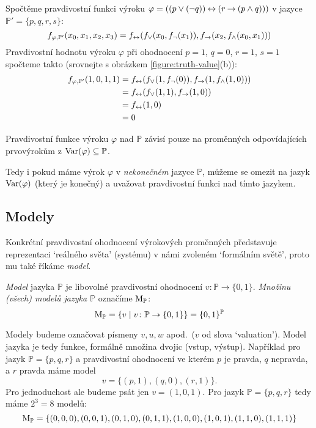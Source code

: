 \begin{example}
    Spočtěme pravdivostní funkci výroku $\varphi = ((p\lor (\neg q)) \mathbin{\leftrightarrow} (r\mathbin{\rightarrow} (p \land q)))$ v jazyce~$\mathbb P'=\{p,q,r,s\}$:
    $$        
    f_{\varphi,\mathbb P'}(x_0,x_1,x_2,x_3)=f_{\mathbin{\leftrightarrow}}(f_{\lor}(x_0,f_\neg(x_1)),f_{\mathbin{\rightarrow}}(x_2,f_{\land}(x_0,x_1)))    
    $$
    Pravdivostní hodnotu výroku $\varphi$ při ohodnocení $p=1$, $q=0$, $r=1$, $s=1$ spočteme takto (srovnejte s obrázkem \ref{figure:truth-value}(b)):
    \begin{align*}
    f_{\varphi,\mathbb P'}(1,0,1,1)
        &=f_{\mathbin{\leftrightarrow}}(f_{\lor}(1,f_\neg(0)),f_{\mathbin{\rightarrow}}(1,f_{\land}(1,0))) \\
        &=f_{\mathbin{\leftrightarrow}}(f_{\lor}(1,1),f_{\mathbin{\rightarrow}}(1,0))\\
        &=f_{\mathbin{\leftrightarrow}}(1,0)\\
        &=0
    \end{align*}
\end{example}

\begin{observation}
Pravdivostní funkce výroku $\varphi$ nad $\mathbb P$ závisí pouze na proměnných odpovídajících prvovýrokům z $\operatorname{Var}(\varphi)\subseteq\mathbb P$.
\end{observation}

Tedy i pokud máme výrok $\varphi$ v \emph{nekonečném} jazyce $\mathbb P$, můžeme se omezit na jazyk $\operatorname{Var}(\varphi)$ (který je konečný) a uvažovat pravdivostní funkci nad tímto jazykem. 


\subsection{Modely}

Konkrétní pravdivostní ohodnocení výrokových proměnných představuje reprezentaci `reálného světa' (systému) v námi zvoleném `formálním světě', proto mu také říkáme \emph{model}.

\begin{definition}\label{definition:model}
    \emph{Model} jazyka $\mathbb P$ je libovolné pravdivostní ohodnocení $v\colon \mathbb P\to \{0,1\}$. \emph{Množinu (všech) modelů jazyka $\mathbb P$} označíme  $\operatorname{M}_\mathbb P$:
    $$
    \operatorname{M}_\mathbb P=\left\{v\mid v\colon \mathbb P\to \{0,1\}\right\}=\{0,1\}^\mathbb P
    $$
\end{definition}
Modely budeme označovat písmeny $v,u,w$ apod.\ ($v$ od slova `valuation'). Model jazyka je tedy funkce, formálně množina dvojic (vstup, výstup). Například pro jazyk $\mathbb P=\{p,q,r\}$ a pravdivostní ohodnocení ve kterém $p$ je pravda, $q$ nepravda, a $r$ pravda máme model
$$
v=\{(p,1),(q,0),(r,1)\}.
$$
Pro jednoduchost ale budeme psát jen $v=(1,0,1)$. Pro jazyk $\mathbb P=\{p,q,r\}$ tedy máme $2^3=8$ modelů: 
$$
\operatorname{M}_\mathbb P=\{(0,0,0),(0,0,1),(0,1,0),(0,1,1),(1,0,0),(1,0,1),(1,1,0),(1,1,1)\}
$$

